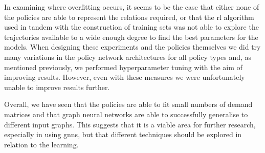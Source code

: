 In examining where overfitting occurs, it seems to be the case that either none of the policies are able to represent the relations required, or that the \ac{rl} algorithm used in tandem with the construction of training sets was not able to explore the trajectories available to a wide enough degree to find the best parameters for the models. When designing these experiments and the policies themselves we did try many variations in the policy network architectures for all policy types and, as mentioned previously, we performed hyperparameter tuning with the aim of improving results. However, even with these measures we were unfortunately unable to improve results further.

Overall, we have seen that the policies are able to fit small numbers of demand matrices and that graph neural networks are able to successfully generalise to different input graphs. This suggests that it is a viable area for further research, especially in using \acp{gnn}, but that different techniques should be explored in relation to the learning.

